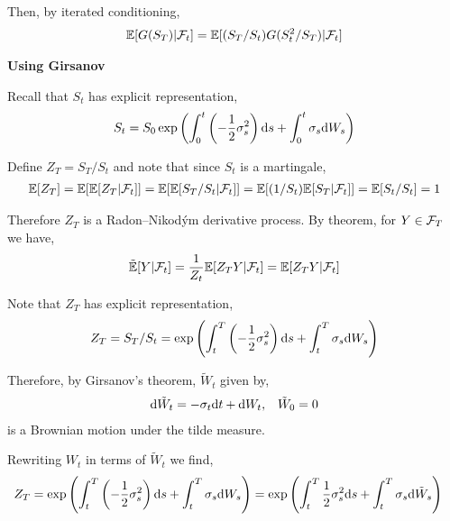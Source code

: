 \begin{solution}[Solution]
\begin{enumerate}[label=(\alph*)]
        Then, by iterated conditioning,
        \begin{align*}
            \mathbb{E}[G(S_T)|\mathcal{F}_t] = \mathbb{E}[(S_T/S_t) G(S_t^2/S_T) | \mathcal{F}_t]
        \end{align*}
          
       


        \hrulefill

        \textbf{Using Girsanov}

        Recall that \( S_t \) has explicit representation, 
        \begin{align*}
            S_t = S_0 \exp\left(\int_0^t \left( -\frac{1}{2}\sigma_s^2 \right) \mathrm{d} s + \int_0^t \sigma_s\mathrm{d} W_s \right)
        \end{align*}

        
        Define \( Z_T = S_T/S_t \) and note that since \( S_t \) is a martingale,
        \begin{align*}
            \mathbb{E}[Z_T] = \mathbb{E}[\mathbb{E}[Z_T | \mathcal{F}_t]] = \mathbb{E}[\mathbb{E}[S_T/S_t | \mathcal{F}_t]] = \mathbb{E}[(1/S_t) \mathbb{E}[S_T|\mathcal{F}_t]] = \mathbb{E}[S_t/S_t] = 1
        \end{align*}
        
        Therefore \( Z_T \) is a Radon--Nikod\'ym derivative process. By theorem, for \( Y \in \mathcal{F}_T \) we have,
        \begin{align*}
            \tilde{\mathbb{E}}[Y  |\mathcal{F}_t] = \frac{1}{Z_t} \mathbb{E}[Z_T Y | \mathcal{F}_t] = \mathbb{E}[Z_T Y | \mathcal{F}_t]
        \end{align*}
        
        Note that \( Z_T \) has explicit representation,
        \begin{align*}
            Z_T = S_T/S_t = \exp \left( \int_t^T \left( -\frac{1}{2}\sigma_s^2 \right)\mathrm{d} s + \int_t^T \sigma_s \mathrm{d} W_s \right)
        \end{align*}

        Therefore, by Girsanov's theorem, \( \tilde{W}_t \) given by,
        \begin{align*}
            \mathrm{d} \tilde{W}_t = -\sigma_t \mathrm{d} t + \mathrm{d} W_t, && \tilde{W}_0 = 0
        \end{align*}
        is a Brownian motion under the tilde measure.
        
        Rewriting \( W_t \) in terms of \( \tilde{W}_t \) we find,
        \begin{align*}
            Z_T &= \exp \left( \int_{t}^{T} \left( -\frac{1}{2}\sigma_s^2 \right)\mathrm{d} s + \int_{t}^{T} \sigma_s \mathrm{d} W_s \right)
            = \exp \left( \int_{t}^{T} \frac{1}{2}\sigma_s^2 \mathrm{d} s + \int_{t}^{T} \sigma_s \mathrm{d} \tilde{W}_s \right)
        \end{align*}


\end{enumerate}
\end{solution}
